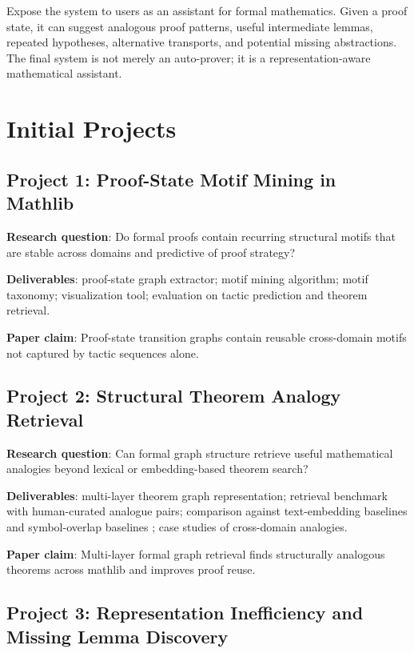 \documentclass[12pt, a4paper]{article}
\begin{document}
Expose the system to users as an assistant for formal mathematics. Given a
proof state, it can suggest analogous proof patterns, useful intermediate
lemmas, repeated hypotheses, alternative transports, and potential missing
abstractions. The final system is not merely an auto-prover; it is a
representation-aware mathematical assistant.

\section{Initial Projects}

\subsection{Project 1: Proof-State Motif Mining in Mathlib}

\textbf{Research question}: Do formal proofs contain recurring structural
motifs that are stable across domains and predictive of proof strategy?

\textbf{Deliverables}: proof-state graph extractor; motif mining algorithm;
motif taxonomy; visualization tool; evaluation on tactic prediction and
theorem retrieval.

\textbf{Paper claim}: Proof-state transition graphs contain reusable
cross-domain motifs not captured by tactic sequences alone.

\subsection{Project 2: Structural Theorem Analogy Retrieval}

\textbf{Research question}: Can formal graph structure retrieve useful
mathematical analogies beyond lexical or embedding-based theorem search?

\textbf{Deliverables}: multi-layer theorem graph representation; retrieval
benchmark with human-curated analogue pairs; comparison against text-embedding
baselines \citep{gao2024leansearch} and symbol-overlap baselines
\citep{meng2009mepo}; case studies of cross-domain analogies.

\textbf{Paper claim}: Multi-layer formal graph retrieval finds structurally
analogous theorems across mathlib and improves proof reuse.

\subsection{Project 3: Representation Inefficiency and Missing Lemma
Discovery}
\end{document}
